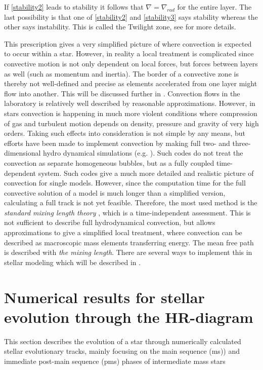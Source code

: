 If \eqref{stability2} leads to stability it follows that $\nabla = \nabla_{rad}$ for the entire layer. The  last possibility is that one of \eqref{stability2} and \eqref{stability3} says stability whereas the other says instability. This is called the Twilight zone, see \citep{kippenhahn1990stellar} for more details.
 
This prescription gives a very simplified picture of where convection is expected to occur within a star. However, in reality a local treatment is complicated since convective motion is not only dependent on local forces, but forces between layers as well (such as momentum and inertia). The border of a convective zone is thereby not well-defined and precise as elements accelerated from one layer might flow into another. This will be discussed further in . 
Convection flows in the laboratory is relatively well described by reasonable approximations. However, in stars convection is happening in much more violent conditions where compression of gas and turbulent motion depends on density, pressure and gravity of very high orders.  Taking such effects into consideration is not simple by any means, but efforts have been made to implement convection by making full two- and three-dimensional hydro dynamical simulations (e.g. \citet{nordlund19903}). Such codes do not treat the convection as separate homogeneous bubbles, but as a fully coupled time-dependent system. Such codes give a much more detailed and realistic picture of convection for single models. However, since the computation time for the full convective solution of a model is much longer than a simplified version, calculating a full track is not yet feasible. Therefore, the most used method is the \textit{standard mixing length theory} \citep{weiss2004cox}, which is a time-independent assessment. This is not sufficient to describe full hydrodynamical convection, but allows approximations to give a simplified local treatment, where convection can be described as macroscopic mass elements transferring energy. The mean free path is described with \textit{the mixing length}. There are several ways to implement this in stellar modeling which will be described in . 


\section[Stellar evolution through the HR-diagram]{Numerical results for stellar evolution through the HR-diagram}
This section describes the evolution of a star through numerically calculated stellar evolutionary tracks, mainly focusing on the main sequence (ms)) and immediate post-main sequence (pms) phases of intermediate mass stars

